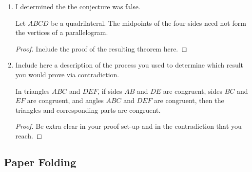 \begin{enumerate}
\item  I determined the the conjecture was false.
\setcounter{section}{3}
\setcounter{theorem}{6}
\begin{theorem}
Let $ABCD$ be a quadrilateral.  The midpoints of the four sides need not form the vertices of a parallelogram.
\end{theorem}
\begin{proof}
Include the proof of the resulting theorem here.
\end{proof}


\item  Include here a description of the process you used to determine which result you would prove via contradiction.
\setcounter{section}{1}
\setcounter{theorem}{4}
\begin{euclidtheorem}


In triangles $ABC$ and $DEF$, if sides $AB$ and $DE$ are congruent, sides $BC$ and $EF$ are congruent, and angles $ABC$ and $DEF$ are congruent, then the triangles and corresponding parts are congruent.

\end{euclidtheorem}

\begin{proof}
Be extra clear in your proof set-up and in the contradiction that you reach.
\end{proof}

\end{enumerate}

\subsection*{Paper Folding}

